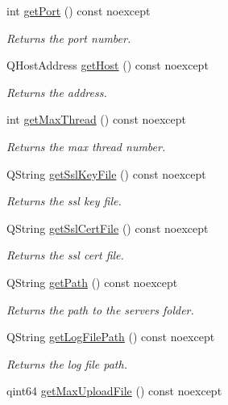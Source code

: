 \begin{DoxyCompactItemize}
int \hyperlink{class_configuration_a71c68a3810e4c408e1e76f66b4ab11ff}{get\+Port} () const noexcept
\begin{DoxyCompactList}\small\item\em Returns the port number. \end{DoxyCompactList}\item 
Q\+Host\+Address \hyperlink{class_configuration_a47b1c954104ceea3c18fac417c1df323}{get\+Host} () const noexcept
\begin{DoxyCompactList}\small\item\em Returns the address. \end{DoxyCompactList}\item 
int \hyperlink{class_configuration_a1adc08d559e9e7209dfd73c436c27288}{get\+Max\+Thread} () const noexcept
\begin{DoxyCompactList}\small\item\em Returns the max thread number. \end{DoxyCompactList}\item 
Q\+String \hyperlink{class_configuration_aff6b12e5b77552fb0feb9f9598335049}{get\+Ssl\+Key\+File} () const noexcept
\begin{DoxyCompactList}\small\item\em Returns the ssl key file. \end{DoxyCompactList}\item 
Q\+String \hyperlink{class_configuration_a7d58b7b13992eb1ce0789b9442ff663c}{get\+Ssl\+Cert\+File} () const noexcept
\begin{DoxyCompactList}\small\item\em Returns the ssl cert file. \end{DoxyCompactList}\item 
Q\+String \hyperlink{class_configuration_ae8a0a39c01183a3ffa8d5e1511a2a883}{get\+Path} () const noexcept
\begin{DoxyCompactList}\small\item\em Returns the path to the server\textquotesingle{}s folder. \end{DoxyCompactList}\item 
Q\+String \hyperlink{class_configuration_a26a2c6ace6f2fbe725998a3ee3656b1c}{get\+Log\+File\+Path} () const noexcept
\begin{DoxyCompactList}\small\item\em Returns the log file path. \end{DoxyCompactList}\item 
qint64 \hyperlink{class_configuration_a6366d5802568dca07d4a633110f07863}{get\+Max\+Upload\+File} () const noexcept

\end{DoxyCompactItemize}
